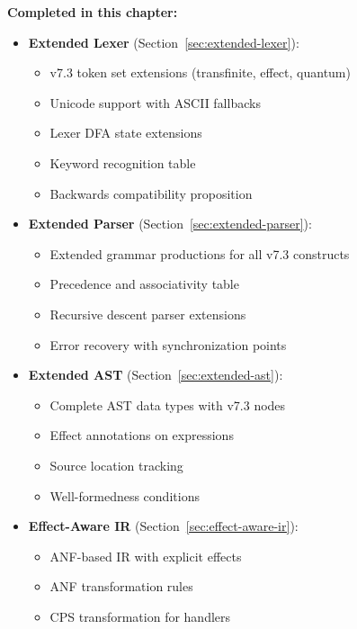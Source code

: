 \begin{tcolorbox}[colback=green!5!white,colframe=green!50!black,title=\textbf{Handoff: COMPILER-TASK-04 Complete},breakable]
\textbf{Completed in this chapter:}
\begin{itemize}
  \item \textbf{Extended Lexer} (Section~\ref{sec:extended-lexer}):
    \begin{itemize}
      \item v7.3 token set extensions (transfinite, effect, quantum)
      \item Unicode support with ASCII fallbacks
      \item Lexer DFA state extensions
      \item Keyword recognition table
      \item Backwards compatibility proposition
    \end{itemize}
  \item \textbf{Extended Parser} (Section~\ref{sec:extended-parser}):
    \begin{itemize}
      \item Extended grammar productions for all v7.3 constructs
      \item Precedence and associativity table
      \item Recursive descent parser extensions
      \item Error recovery with synchronization points
    \end{itemize}
  \item \textbf{Extended AST} (Section~\ref{sec:extended-ast}):
    \begin{itemize}
      \item Complete AST data types with v7.3 nodes
      \item Effect annotations on expressions
      \item Source location tracking
      \item Well-formedness conditions
    \end{itemize}
  \item \textbf{Effect-Aware IR} (Section~\ref{sec:effect-aware-ir}):
    \begin{itemize}
      \item ANF-based IR with explicit effects
      \item ANF transformation rules
      \item CPS transformation for handlers

\end{itemize}
\end{itemize}
\end{tcolorbox}
